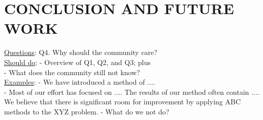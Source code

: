 
\section{CONCLUSION AND FUTURE WORK}
\uline{Questions}: Q4. Why should the community care?\\

\noindent\uline{Should do}: 
- Overview of Q1, Q2, and Q3; plus\\
- What does the community still not know?\\

\noindent\uline{Examples}:
- We have introduced a method of ....\\
- Most of our effort has focused on .... The results of our method often contain .... We believe that there is significant room for improvement by applying ABC methods to the XYZ problem.
- What do we not do?